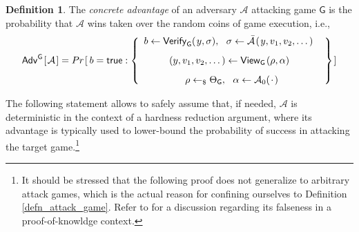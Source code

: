 \documentclass[psamsfonts, reqno]{amsart}
\theoremstyle{definition}
\newtheorem{defn}[thm]{Definition}
\theoremstyle{remark}
\numberwithin{equation}{section}
\begin{document}
\begin{defn}\label{concrete_advantage_def}
The \textit{concrete advantage}
of an adversary $\mathcal{A}$ attacking
game $\mathsf{G}$
is the probability that $\mathcal{A}$ wins
taken over the random coins of game execution, i.e.,
\vspace{8pt}
\begin{equation}\label{concrete_advantage_def_probabilities}
	\mathsf{Adv}^{\hspace{0pt}\mathsf{G}}\hspace{1pt}[
		\hspace{1pt}
		\mathcal{A}
		\hspace{1pt}
	]
	=
	Pr\hspace{1pt}[
		\hspace{2pt}
		b
		=
		\mathsf{true} :
	\begin{Bmatrix}
	\hspace{5pt}b \leftarrow
	\mathsf{Verify}_\mathsf{G}(\hspace{1pt}y, \sigma),
	\ \ \sigma \leftarrow
	\mathcal{\bar{A}}\hspace{1pt}(\hspace{1pt}y, v_1, v_2, \dots)\hspace{5pt}\ \ \\[8pt]
	 \hspace{5pt} (y, v_1, v_2, \dots) \leftarrow \mathsf{View}_\mathsf{G}\hspace{1pt}(\rho, \alpha)\ \ \ \\[8pt]
	\rho \leftarrow_\$ \Theta_\mathsf{G},
	\ \ \alpha \leftarrow \mathcal{A}_0 (\hspace{1pt}\cdot\hspace{1pt})
	\end{Bmatrix}
	\hspace{1pt}]
\vspace{8pt}
\end{equation}
\end{defn}

\noindent
The following statement
allows to safely assume that,
if needed, $\mathcal{A}$ is deterministic
in the context of a hardness reduction argument,
where its advantage is typically used to lower-bound
the probability of success in attacking the target
game.\footnote{It should be stressed that the following
proof does not generalize to
arbitrary attack games, which is the actual reason
for confining ourselves to Definition \ref{defn_attack_game}.
Refer to \cite{paper_bellare_goldreich} for a discussion
regarding its falseness in a proof-of-knowldge context.}
\end{document}
